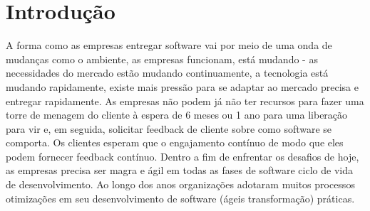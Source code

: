 \chapter{Introdução}
\label{cap-introducao}


A forma como as empresas entregar software vai
por meio de uma onda de mudanças como o ambiente,
as empresas funcionam, está mudando - as necessidades do mercado
estão mudando continuamente, a tecnologia está mudando
rapidamente, existe mais pressão para se adaptar ao mercado
precisa e entregar rapidamente. As empresas não podem
já não ter recursos para fazer uma torre de menagem do cliente à espera de
6 meses ou 1 ano para uma liberação para vir e, em seguida,
solicitar feedback de cliente sobre como software
se comporta. Os clientes esperam que o engajamento contínuo
de modo que eles podem fornecer feedback contínuo. Dentro
a fim de enfrentar os desafios de hoje, as empresas
precisa ser magra e ágil em todas as fases de
software ciclo de vida de desenvolvimento. Ao longo dos anos
organizações adotaram muitos processos
otimizações em seu desenvolvimento de software (ágeis
transformação) práticas. \cite{7173368}


